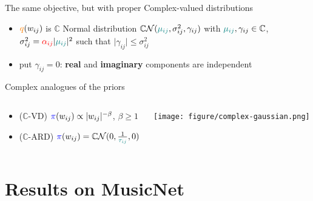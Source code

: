 \documentclass{beamer}
\newcommand{\cplx}{\mathbb{C}}
\begin{document}
\begin{frame}[c]{\insertsection}

The same objective, but with proper Complex-valued distributions
\begin{itemize}
  \item $
    {\color{orange} q}(w_{ij})
  $ is $\cplx$ Normal distribution $
    \cplx\mathcal{N}(
      {\color{teal} \mu_{ij}},
      \sigma^2_{ij},
      \gamma_{ij}
    )
  $ with $
    {\color{teal} \mu_{ij}}, \gamma_{ij} \in \cplx
  $, $
    \sigma^2_{ij}
      = {\color{red} \alpha_{ij}}
        \lvert {\color{teal} \mu_{ij}} \rvert^2
  $ such that $\lvert \gamma_{ij}\rvert \leq \sigma^2_{ij}$
  \item put $\gamma_{ij} = 0$: 
    \textbf{real} and \textbf{imaginary} components are independent
\end{itemize} 

\bigskip
Complex analogues of the priors
\begin{columns}[T]
  \begin{column}{0.58\linewidth}
    \begin{itemize}
      \item ($\cplx$-VD) $
        {\color{blue} \pi}(w_{ij})
            \propto \lvert w_{ij}\rvert^{-\beta}
      $, $\beta \geq 1$
      \smallskip
      \item ($\cplx$-ARD) $
        {\color{blue} \pi}(w_{ij})
            = \cplx\mathcal{N}(
              0, \tfrac1{{\color{teal} \tau_{ij}}}, 0
            )
      $
    \end{itemize}
  \end{column}
  \begin{column}{0.40\linewidth}
    \texttt{[image: figure/complex-gaussian.png]}
  \end{column}
\end{columns}

\end{frame}



\section{Results on MusicNet} %
\label{sec:results_on_musicnet}
\end{document}
